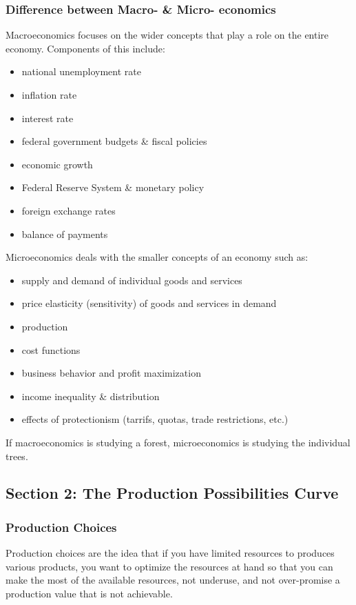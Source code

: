 \documentclass[a4paper, 12pt] {article}
\begin{document}
\subsubsection{Difference between Macro- \& Micro- economics}
Macroeconomics focuses on the wider concepts that play a role on the entire
economy. Components of this include:
\begin{itemize}
    \item national unemployment rate
    \item inflation rate
    \item interest rate
    \item federal government budgets \& fiscal policies
    \item economic growth
    \item Federal Reserve System \& monetary policy
    \item foreign exchange rates
    \item balance of payments
\end{itemize}
Microeconomics deals with the smaller concepts of an economy such as:
\begin{itemize}
    \item supply and demand of individual goods and services
    \item price elasticity (sensitivity) of goods and services in demand
    \item production
    \item cost functions
    \item business behavior and profit maximization
    \item income inequality \& distribution
    \item effects of protectionism (tarrifs, quotas, trade restrictions, etc.)
\end{itemize}
If macroeconomics is studying a forest, microeconomics is studying the
individual trees.

\subsection{Section 2: The Production Possibilities Curve}
\subsubsection{Production Choices}
Production choices are the idea that if you have limited resources to produces
various products, you want to optimize the resources at hand so that you can make
the most of the available resources, not underuse, and not over-promise a production
value that is not achievable.
\end{document}
